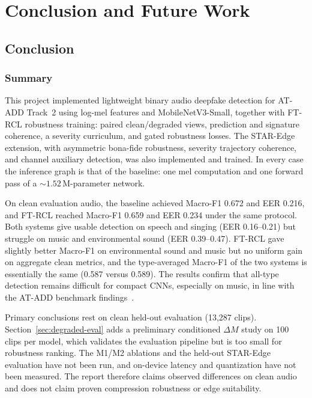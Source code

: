 \chapter{Conclusion and Future Work}
\label{ch:conclusion}

\section{Conclusion}

\subsection{Summary}

This project implemented lightweight binary audio deepfake detection for AT-ADD Track~2 using log-mel features and MobileNetV3-Small, together with FT-RCL robustness training: paired clean/degraded views, prediction and signature coherence, a severity curriculum, and gated robustness losses. The STAR-Edge extension, with asymmetric bona-fide robustness, severity trajectory coherence, and channel auxiliary detection, was also implemented and trained. In every case the inference graph is that of the baseline: one mel computation and one forward pass of a ${\sim}1.52$\,M-parameter network.

On clean evaluation audio, the baseline achieved Macro-F1 0.672 and EER 0.216, and FT-RCL reached Macro-F1 0.659 and EER 0.234 under the same protocol. Both systems give usable detection on speech and singing (EER 0.16--0.21) but struggle on music and environmental sound (EER 0.39--0.47). FT-RCL gave slightly better Macro-F1 on environmental sound and music but no uniform gain on aggregate clean metrics, and the type-averaged Macro-F1 of the two systems is essentially the same (0.587 versus 0.589). The results confirm that all-type detection remains difficult for compact CNNs, especially on music, in line with the AT-ADD benchmark findings~\cite{xie2026atadd}.

Primary conclusions rest on clean held-out evaluation (13{,}287 clips). Section~\ref{sec:degraded-eval} adds a preliminary conditioned $\Delta M$ study on 100 clips per model, which validates the evaluation pipeline but is too small for robustness ranking. The M1/M2 ablations and the held-out STAR-Edge evaluation have not been run, and on-device latency and quantization have not been measured. The report therefore claims observed differences on clean audio and does not claim proven compression robustness or edge suitability.

